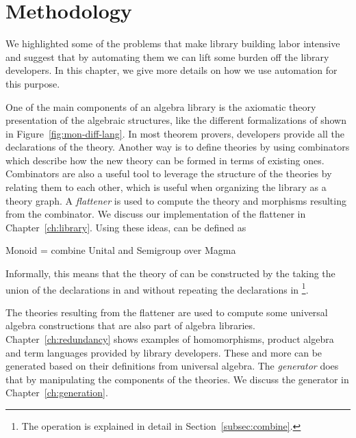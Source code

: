 \chapter{Methodology}
\label{ch:design}

We highlighted some of the problems that make library building labor intensive and suggest that by automating them we can lift some burden off the library developers. In this chapter, we give more details on how we use automation for this purpose. 

One of the main components of an algebra library is the axiomatic theory presentation of the algebraic structures, like the different formalizations of  shown in Figure~\ref{fig:mon-diff-lang}. In most theorem provers, developers provide all the declarations of the theory. Another way is to define theories by using combinators which describe how the new theory can be formed in terms of existing ones. 
Combinators are also a useful tool to leverage the structure of the theories by relating them to each other, which is useful when organizing the library as a theory graph. A \emph{flattener} is used to compute the theory and morphisms resulting from the combinator. We discuss our implementation of the flattener in Chapter~\ref{ch:library}. Using these ideas,  can be defined as 
\begin{togcode} 
Monoid = combine Unital and Semigroup over Magma
\end{togcode} 
Informally, this means that the theory of  can be constructed by the taking the union of the declarations in   and  without repeating the declarations in \footnote{The  operation is explained in detail in Section~\ref{subsec:combine}.}. 

The theories resulting from the flattener are used to compute some universal algebra constructions that are also part of algebra libraries. Chapter~\ref{ch:redundancy} shows examples of homomorphisms, product algebra and term languages provided by library developers. These and more can be generated based on their definitions from universal algebra. The \emph{generator} does that by manipulating the  components of the theories. We discuss the generator in Chapter~\ref{ch:generation}. 

